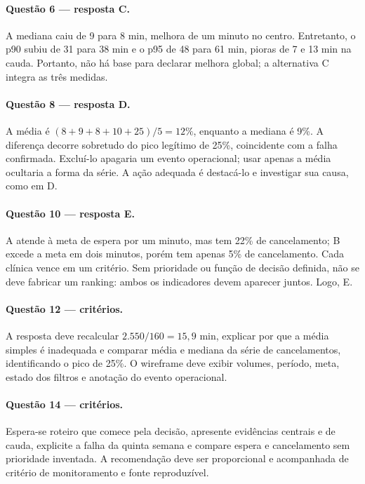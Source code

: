 \paragraph{Questão 6 --- resposta C.} A mediana caiu de 9 para 8 min, melhora de um minuto no centro. Entretanto, o p90 subiu de 31 para 38 min e o p95 de 48 para 61 min, pioras de 7 e 13 min na cauda. Portanto, não há base para declarar melhora global; a alternativa C integra as três medidas.

\paragraph{Questão 8 --- resposta D.} A média é $(8+9+8+10+25)/5=12\%$, enquanto a mediana é 9\%. A diferença decorre sobretudo do pico legítimo de 25\%, coincidente com a falha confirmada. Excluí-lo apagaria um evento operacional; usar apenas a média ocultaria a forma da série. A ação adequada é destacá-lo e investigar sua causa, como em D.

\paragraph{Questão 10 --- resposta E.} A atende à meta de espera por um minuto, mas tem 22\% de cancelamento; B excede a meta em dois minutos, porém tem apenas 5\% de cancelamento. Cada clínica vence em um critério. Sem prioridade ou função de decisão definida, não se deve fabricar um ranking: ambos os indicadores devem aparecer juntos. Logo, E.

\paragraph{Questão 12 --- critérios.} A resposta deve recalcular $2.550/160=15{,}9$ min, explicar por que a média simples é inadequada e comparar média e mediana da série de cancelamentos, identificando o pico de 25\%. O wireframe deve exibir volumes, período, meta, estado dos filtros e anotação do evento operacional.

\paragraph{Questão 14 --- critérios.} Espera-se roteiro que comece pela decisão, apresente evidências centrais e de cauda, explicite a falha da quinta semana e compare espera e cancelamento sem prioridade inventada. A recomendação deve ser proporcional e acompanhada de critério de monitoramento e fonte reproduzível.
